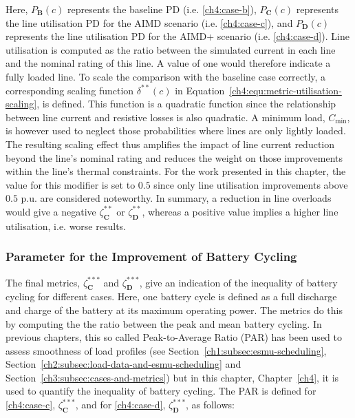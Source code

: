 



Here, $P_\textbf{B}(c)$ represents the baseline PD (i.e. \ref{ch4:case-b}), $P_\textbf{C}(c)$ represents the line utilisation PD for the AIMD scenario (i.e. \ref{ch4:case-c}), and $P_\textbf{D}(c)$ represents the line utilisation PD for the AIMD+ scenario (i.e. \ref{ch4:case-d}).
Line utilisation is computed as the ratio between the simulated current in each line and the nominal rating of this line.
A value of one would therefore indicate a fully loaded line.
To scale the comparison with the baseline case correctly, a corresponding scaling function $\delta^{**}(c)$ in Equation~\ref{ch4:equ:metric-utilisation-scaling}, is defined.
This function is a quadratic function since the relationship between line current and resistive losses is also quadratic.
A minimum load, $C_\text{min}$, is however used to neglect those probabilities where lines are only lightly loaded.
The resulting scaling effect thus amplifies the impact of line current reduction beyond the line's nominal rating and reduces the weight on those improvements within the line's thermal constraints.
For the work presented in this chapter, the value for this modifier is set to $0.5$ since only line utilisation improvements above $0.5$ p.u. are considered noteworthy.
In summary, a reduction in line overloads would give a negative $\zeta^{**}_\textbf{C}$ or $\zeta^{**}_\textbf{D}$, whereas a positive value implies a higher line utilisation, i.e. worse results.

\subsubsection{Parameter for the Improvement of Battery Cycling}

The final metrics, $\zeta^{***}_\textbf{C}$ and $\zeta^{***}_\textbf{D}$, give an indication of the inequality of battery cycling for different cases.
Here, one battery cycle is defined as a full discharge and charge of the battery at its maximum operating power.
The metrics do this by computing the the ratio between the peak and mean battery cycling.
In previous chapters, this so called Peak-to-Average Ratio (PAR) has been used to assess smoothness of load profiles (see Section~\ref{ch1:subsec:esmu-scheduling}, Section~\ref{ch2:subsec:load-data-and-esmu-scheduling} and Section~\ref{ch3:subsec:cases-and-metrics}) but in this chapter, Chapter~\ref{ch4}, it is used to quantify the inequality of battery cycling.
The PAR is defined for \ref{ch4:case-c}, $\zeta_\textbf{C}^{***}$, and for \ref{ch4:case-d}, $\zeta_\textbf{D}^{***}$, as follows:

